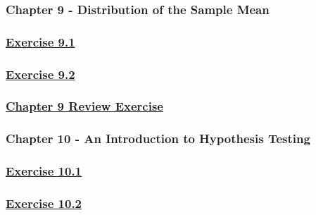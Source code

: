\documentclass[
  11pt,
]{book}
\begin{document}
\subsubsection*{Chapter 9 - Distribution of the Sample Mean}\label{chapter-9---distribution-of-the-sample-mean}

\subsubsection*{\texorpdfstring{\hyperref[ex91q]{Exercise 9.1}}{Exercise 9.1}}\label{exercise-9.1-1}

\subsubsection*{\texorpdfstring{\hyperref[ex92q]{Exercise 9.2}}{Exercise 9.2}}\label{exercise-9.2-1}

\subsubsection*{\texorpdfstring{\hyperref[re9q]{Chapter 9 Review Exercise}}{Chapter 9 Review Exercise}}\label{chapter-9-review-exercise}

\subsubsection*{Chapter 10 - An Introduction to Hypothesis Testing}\label{chapter-10---an-introduction-to-hypothesis-testing}

\subsubsection*{\texorpdfstring{\hyperref[ex101q]{Exercise 10.1}}{Exercise 10.1}}\label{exercise-10.1-1}

\subsubsection*{\texorpdfstring{\hyperref[ex102q]{Exercise 10.2}}{Exercise 10.2}}\label{exercise-10.2-1}
\end{document}
